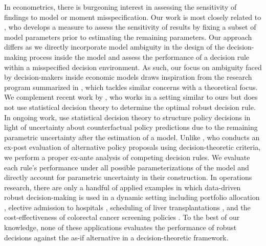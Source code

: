 {In econometrics, there is burgeoning interest in assessing the sensitivity of findings to model or moment misspecification. Our work is most closely related to \cite{Jorgensen.2021}, who develops a measure to assess the sensitivity of results by fixing a subset of model parameters prior to estimating the remaining parameters. Our approach differs as we directly incorporate model ambiguity in the design of the decision-making process inside the model and assess the performance of a decision rule within a misspecified decision environment. As such, our focus on ambiguity faced by decision-makers inside economic models draws inspiration from the research program summarized in \cite{Hansen.2016}, which tackles similar concerns with a theoretical focus. We complement recent work by \cite{Saghafian.2018}, who works in a setting similar to ours but does not use statistical decision theory to determine the optimal robust decision rule. In ongoing work, \cite{Eisenhauer.2021} use statistical decision theory to structure policy decisions in light of uncertainty about counterfactual policy predictions due to the remaining parametric uncertainty after the estimation of a model. Unlike \cite{Eisenhauer.2021}, who conducts an ex-post evaluation of alternative policy proposals using decision-theoretic criteria, we perform a proper ex-ante analysis of competing decision rules. We evaluate each rule's performance under all possible parameterizations of the model and directly account for parametric uncertainty in their construction. In operations research, there are only a handful of applied examples in which data-driven robust decision-making is used in a dynamic setting including portfolio allocation \cite{Zymler.2013}, elective admission to hospitals \cite{Meng.2015}, scheduling of liver transplantations \cite{Kaufman.2017}, and the cost-effectiveness of colorectal cancer screening policies \cite{Goh.2018}. To the best of our knowledge, none of these applications evaluates the performance of robust decisions against the as-if alternative in a decision-theoretic framework.

\newpage


%
%
%
% 
%
}  %
